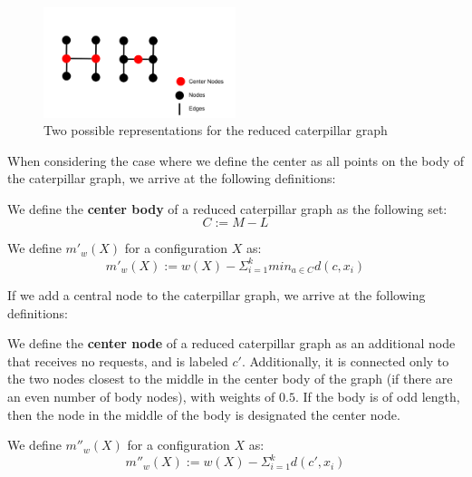 \begin{figure}[H]
    \centering
    \includegraphics[width=0.5\textwidth]{images/center.png}
    \caption{Two possible representations for the reduced caterpillar graph}
    \label{fig:smallcat}
\end{figure}

When considering the case where we define the center as all points on the body of the caterpillar graph, we arrive at the following definitions:

\begin{definition}
     We define the \textbf{center body} of a reduced caterpillar graph as the following set:
        \begin{equation*}
            C := M - L
        \end{equation*}
\end{definition}

\begin{definition}
    We define $m'_w(X)$ for a configuration $X$ as:
    \begin{equation*}
        m'_w(X) := w(X) - \Sigma_{i=1} ^ k min_{a \in C} d(c, x_i)
    \end{equation*}
\end{definition}

If we add a central node to the caterpillar graph, we arrive at the following definitions:

\begin{definition}
    We define the \textbf{center node} of a reduced caterpillar graph as an additional node that receives no requests, and is labeled $c'$. Additionally, it is connected only to the two nodes closest to the middle in the center body of the graph (if there are an even number of body nodes), with weights of $0.5$. If the body is of odd length, then the node in the middle of the body is designated the center node.
\end{definition}

\begin{definition}
    We define $m''_w(X)$ for a configuration $X$ as:
    \begin{equation*}
        m''_w(X) := w(X) - \Sigma_{i=1} ^ k d(c', x_i)
    \end{equation*}
\end{definition}

